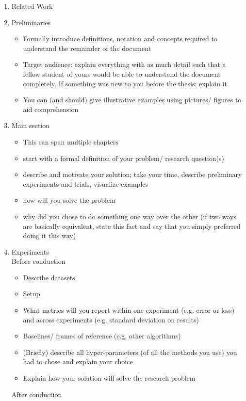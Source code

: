 \documentclass[logo, twocolumn]{mlai-report}
\begin{document}
\begin{enumerate}
	\item Related Work
	\item Preliminaries
		\begin{itemize}
			\item Formally introduce definitions, notation and concepts required to understand the remainder of the document
			\item Target audience: explain everything with as much detail such that a fellow student of yours would be able to understand the document completely. If something was new to you before the thesis: explain it.
			\item You can (and should) give illustrative examples using pictures/ figures to aid comprehension
		\end{itemize}
	\item Main section
		\begin{itemize}
			\item This can span multiple chapters
			\item start with a formal definition of your problem/ research question(s)
			\item describe and motivate your solution; take your time, describe preliminary experiments and trials, visualize examples
			\item how will you solve the problem
			\item why did you chose to do something one way over the other (if two ways are basically equivalent, state this fact and say that you simply preferred doing it this way)
		\end{itemize}
	\item Experiments\\
		Before conduction
		\begin{itemize}
			\item Describe datasets
			\item Setup
			\item What metrics will you report within one experiment (e.g. error or loss) and across experiments (e.g. standard deviation on results)
			\item Baselines/ frames of reference (e.g. other algorithms)
			\item (Briefly) describe all hyper-parameters (of all the methods you use) you had to chose and explain your choice
			\item Explain how your solution will solve the research problem
		\end{itemize} 
		After conduction
		\begin{itemize}

\end{itemize}
\end{enumerate}
\end{document}
